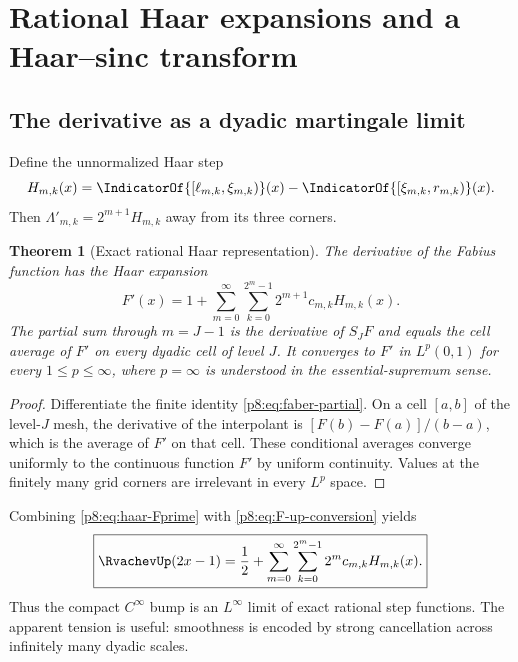 \documentclass[11pt]{article}
\newtheorem{theorem}{Theorem}[section]
\theoremstyle{definition}
\theoremstyle{remark}
\begin{document}
\section{Rational Haar expansions and a Haar--sinc transform}
\label{p8:sec:haar}

\subsection{The derivative as a dyadic martingale limit}

Define the unnormalized Haar step
\begin{equation}
 H_{m,k}(x)=
 \IndicatorOf{[\ell_{m,k},\xi_{m,k})}(x)
 -\IndicatorOf{[\xi_{m,k},r_{m,k})}(x).                  \label{p8:eq:haar-step}
\end{equation}
Then $\Lambda'_{m,k}=2^{m+1}H_{m,k}$ away from its three
corners.

\begin{theorem}[Exact rational Haar representation]
\label{p8:thm:haar-Fprime}
The derivative of the Fabius function has the Haar expansion
\begin{equation}
 \boxed{\displaystyle
 F'(x)=1+\sum_{m=0}^\infty\sum_{k=0}^{2^m-1}
 2^{m+1}c_{m,k}H_{m,k}(x).}                              \label{p8:eq:haar-Fprime}
\end{equation}
The partial sum through $m=J-1$ is the derivative of $S_JF$ and equals the
cell average of $F'$ on every dyadic cell of level $J$.  It converges to
$F'$ in $L^p(0,1)$ for every $1\le p\le\infty$, where $p=\infty$ is
understood in the essential-supremum sense.
\end{theorem}

\begin{proof}
Differentiate the finite identity \eqref{p8:eq:faber-partial}.  On a cell
$[a,b]$ of the level-$J$ mesh, the derivative of the interpolant is
$[F(b)-F(a)]/(b-a)$, which is the average of $F'$ on that cell.  These
conditional averages converge uniformly to the continuous function $F'$ by
uniform continuity.  Values at the finitely many grid corners are irrelevant
in every $L^p$ space.
\end{proof}

Combining \eqref{p8:eq:haar-Fprime} with \eqref{p8:eq:F-up-conversion} yields
\begin{equation}
 \boxed{\displaystyle
 \RvachevUp(2x-1)=\frac12+
 \sum_{m=0}^\infty\sum_{k=0}^{2^m-1}
 2^m c_{m,k}H_{m,k}(x).}                                 \label{p8:eq:haar-up}
\end{equation}
Thus the compact $C^\infty$ bump is an $L^\infty$ limit of exact rational
step functions.  The apparent tension is useful: smoothness is encoded by
strong cancellation across infinitely many dyadic scales.
\end{document}
